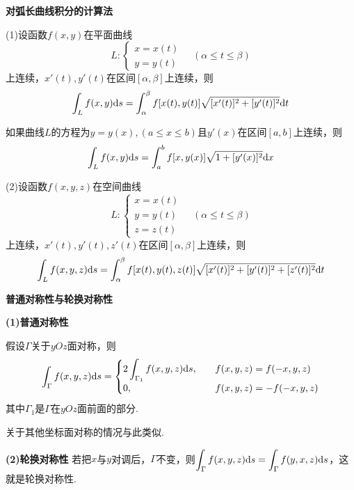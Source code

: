 \textbf{对弧长曲线积分的计算法}

(1)设函数$f(x,y)$在平面曲线
\begin{equation*}
    L:
    \begin{cases}
        x=x(t) \\
        y=y(t)
    \end{cases}
    \quad (\alpha\leq t\leq \beta)
\end{equation*}
上连续，$x'(t),y'(t)$在区间$[\alpha,\beta]$上连续，则
\begin{equation*}
    \int_{L}f(x,y)\mathrm{d} s=\int_{\alpha}^{\beta}f[x(t),y(t)]\sqrt{[x'(t)]^{2}+[y'(t)]^{2}}\mathrm{d} t
\end{equation*}

如果曲线$L$的方程为$y=y(x),(a\leq x\leq b)$且$y'(x)$在区间$[a,b]$上连续，则
\begin{equation*}
    \int_{L}f(x,y)\mathrm{d} s=\int_{a}^{b}f[x,y(x)]\sqrt{1+[y'(x)]^{2}}\mathrm{d} x
\end{equation*}

(2)设函数$f(x,y,z)$在空间曲线
\begin{equation*}
    L:
    \begin{cases}
        x=x(t) \\
        y=y(t) \\
        z=z(t)
    \end{cases}
    \quad (\alpha\leq t\leq \beta)
\end{equation*}
上连续，$x'(t),y'(t),z'(t)$在区间$[\alpha,\beta]$上连续，则
\begin{equation*}
    \int_{L}f(x,y,z)\mathrm{d} s=\int_{\alpha}^{\beta}f[x(t),y(t),z(t)]\sqrt{[x'(t)]^{2}+[y'(t)]^{2}+[z'(t)]^{2}}\mathrm{d} t
\end{equation*}

\textbf{普通对称性与轮换对称性}

\textbf{(1)普通对称性}

假设$\Gamma$关于$yOz$面对称，则
\begin{equation*}
    \int_{\Gamma}f(x,y,z)\mathrm{d} s=
    \begin{cases}
        2\displaystyle\int_{\Gamma_1}f(x,y,z)\mathrm{d} s, \quad & f(x,y,z)=f(-x,y,z) \\
        0, \quad & f(x,y,z)=-f(-x,y,z)
    \end{cases}
\end{equation*}
其中$\Gamma_1$是$\Gamma$在$yOz$面前面的部分.

关于其他坐标面对称的情况与此类似.

\textbf{(2)轮换对称性}
若把$x$与$y$对调后，$\Gamma$不变，则$\displaystyle\int_{\Gamma}f(x,y,z)\mathrm{d} s=\int_{\Gamma}f(y,x,z)\mathrm{d} s$，这就是轮换对称性.

